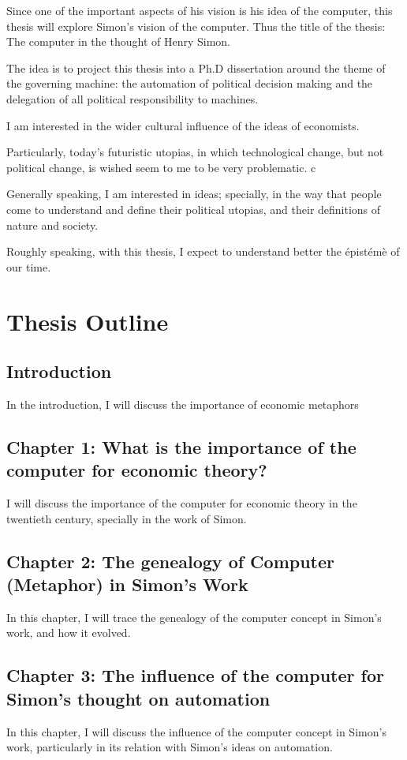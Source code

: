 \documentclass[paper=B6,portrait,twoside=true,twocolumn=false,headinclude=true,footinclude=false,fontsize=12,BCOR=10mm,DIV=calc,pagesize=auto,titlepage=firstiscover,mpinclude=false,headings=normal,headings=twolinechapter,open=right,toc=graduated,chapterprefix=false,numbers=endperiod,parskip=half+]{scrbook}
\theoremstyle{definition}
\begin{document}
Since one of the important aspects of his vision is his idea of the
computer, this thesis will explore Simon's vision of the computer. Thus the
title of the thesis: The computer in the thought of Henry Simon.

The idea is to project this thesis into a Ph.D dissertation around the
theme of the governing machine: the automation of political decision making
and the delegation of all political responsibility to machines.

 I am interested in
the wider cultural influence of the ideas of economists.

Particularly, today's futuristic utopias, in which technological change,
but not political change, is wished seem to me to be very problematic. c

Generally speaking, I am interested in ideas; specially, in the way that
people come to understand and define their political utopias, and their
definitions of nature and society.  

Roughly speaking, with this thesis, I expect to understand better the
épistémè of our time.

\section{Thesis Outline}
\label{sec:orgb84b4c2}
\subsection{Introduction}
\label{sec:org24a94aa}
In the introduction, I will discuss the importance of economic metaphors 
\subsection{Chapter 1: What is the importance of the computer for economic theory?}
\label{sec:org377ed53}
I will discuss the importance of the computer for economic theory in the
twentieth century, specially in the work of Simon. 
\subsection{Chapter 2: The genealogy of Computer (Metaphor) in Simon's Work}
\label{sec:org6d1e2c5}
In this chapter, I will trace the genealogy of the computer concept in
Simon's work, and how it evolved. 
\subsection{Chapter 3: The influence of the computer for Simon's thought on automation}
\label{sec:orgb7d856e}
In this chapter, I will discuss the influence of the computer concept in
Simon's work, particularly in its relation with Simon's ideas on
automation.
\end{document}
